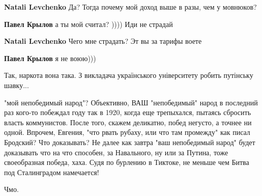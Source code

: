 \begin{itemize}
\begin{itemize}
\textbf{Natali Levchenko} Да? Тогда почему мой доход выше в разы, чем у мовнюков?

 
\textbf{Павел Крылов} а ты мой считал? )))) Иди не страдай

 
\textbf{Natali Levchenko} Чего мне страдать? Эт вы за тарифы воете

 
\textbf{Павел Крылов} я не воюю)))

\end{itemize}

 
Так, наркота вона така. З викладача українського університету робить путінську шавку...

 

"мой непобедимый народ"? Объективно, ВАШ "непобедимый" народ в последний раз
кого-то побеждал году так в 1920, когда еще трепыхался, пытаясь сбросить власть
коммунистов. После того, скажем деликатно, побед негусто, а точнее ни одной.
Впрочем, Евгения, "что рвать рубаху, или что там промежду" как писал Бродский?
Что доказывать? Не далее как завтра "ваш непобедимый народ" будет доказывать
что на что способен, за Навального, ну или за Путина, тоже своеобразная победа,
хаха. Судя по бурлению в Тиктоке, не меньше чем Битва под Сталинградом
намечается!

 

Чмо.

\begin{itemize}
 

\end{itemize}
\end{itemize}
